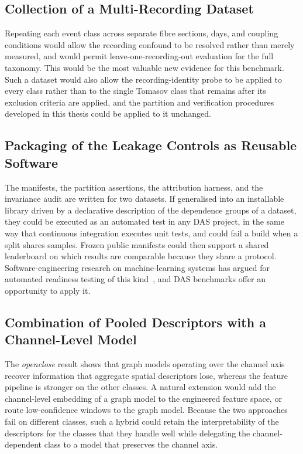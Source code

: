 \subsection{Collection of a Multi-Recording Dataset}
\label{sec:chap5FutureDataset}
Repeating each event class across separate fibre sections, days, and coupling conditions would allow the recording confound to be resolved rather than merely measured, and would permit leave-one-recording-out evaluation for the full taxonomy. This would be the most valuable new evidence for this benchmark. Such a dataset would also allow the recording-identity probe to be applied to every class rather than to the single Tomasov class that remains after its exclusion criteria are applied, and the partition and verification procedures developed in this thesis could be applied to it unchanged.

\subsection{Packaging of the Leakage Controls as Reusable Software}
\label{sec:chap5FutureTooling}
The manifests, the partition assertions, the attribution harness, and the invariance audit are written for two datasets. If generalised into an installable library driven by a declarative description of the dependence groups of a dataset, they could be executed as an automated test in any DAS project, in the same way that continuous integration executes unit tests, and could fail a build when a split shares samples. Frozen public manifests could then support a shared leaderboard on which results are comparable because they share a protocol. Software-engineering research on machine-learning systems has argued for automated readiness testing of this kind~\cite{sculley2015debt,breck2017mltest}, and DAS benchmarks offer an opportunity to apply it.

\subsection{Combination of Pooled Descriptors with a Channel-Level Model}
\label{sec:chap5FutureChannelModel}
The \emph{openclose} result shows that graph models operating over the channel axis recover information that aggregate spatial descriptors lose, whereas the feature pipeline is stronger on the other classes. A natural extension would add the channel-level embedding of a graph model to the engineered feature space, or route low-confidence windows to the graph model. Because the two approaches fail on different classes, such a hybrid could retain the interpretability of the descriptors for the classes that they handle well while delegating the channel-dependent class to a model that preserves the channel axis.

